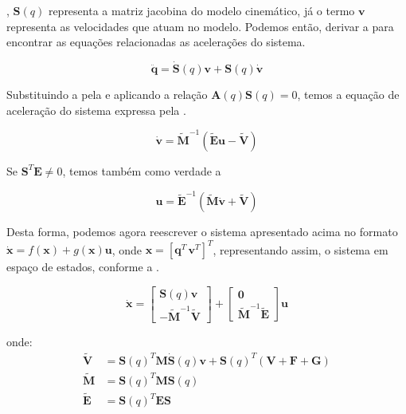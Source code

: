 , $\mathbf{S}(q)$ representa a matriz jacobina do modelo cinemático, já o termo $\mathbf{v}$ representa as velocidades 
que atuam no modelo. Podemos então, derivar a  para encontrar as equações relacionadas as acelerações do sistema.

\begin{equation}\label{eq:aprox_accel}
    \mathbf{\ddot{q}} = \mathbf{\dot{S}}(q)\mathbf{v} + \mathbf{S}(q)\mathbf{\dot{v}}
\end{equation}

Substituindo a  pela  e aplicando a relação $\mathbf{A}(q)\mathbf{S}(q)=0$, temos a equação de aceleração do sistema expressa pela .

\begin{equation}
    \mathbf{\dot{v}} = \mathbf{\tilde{M}}^{-1}\left(\mathbf{\tilde{E}u - \tilde{V}} \right)
    \label{eq:pseudovelo}
\end{equation}

Se $\mathbf{S}^T\mathbf{E} \neq 0$, temos também como verdade a 

\begin{equation}
    \mathbf{u} = \mathbf{\tilde{E}}^{-1}\left( \mathbf{\tilde{M}\dot{v}} + \mathbf{\tilde{V}} \right)
    \label{eq:pseudovelo2}
\end{equation}

Desta forma, podemos agora reescrever o sistema apresentado acima no formato $\mathbf{\dot{x}} = f(\mathbf{x})+ g(\mathbf{x})\mathbf{u}$,
onde $\mathbf{x} = \left[ \mathbf{q}^T \, \mathbf{v}^T \right]^T$, representando assim, o sistema em espaço de estados, conforme a .

\begin{equation*}
    \mathbf{\dot{x}} =
    \begin{bmatrix}
        \mathbf{S}(q)\mathbf{v} \\
        \mathbf{-\tilde{M}}^{-1}\mathbf{\tilde{V}}
    \end{bmatrix}
    +
    \begin{bmatrix}
        \mathbf{0} \\
        \mathbf{\tilde{M}}^{-1}\mathbf{\tilde{E}}
    \end{bmatrix} \mathbf{u}
    \label{eq:statespace}
\end{equation*}

\noindent onde:
\begin{equation*}
    \begin{split}
        \mathbf{\tilde{V}} & =
        \mathbf{S}(q)^T\mathbf{M}\mathbf{\dot{S}}(q)\mathbf{v} + \mathbf{S}(q)^T (\mathbf{V + F + G})\\
        \mathbf{\tilde{M}} & = \mathbf{S}(q)^T\mathbf{M}\mathbf{S}(q)\\
        \mathbf{\tilde{E}} & = \mathbf{S}(q)^T\mathbf{E}\mathbf{S}
    \end{split}
\end{equation*}

